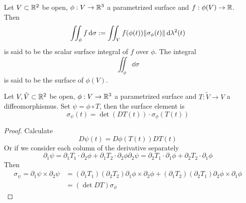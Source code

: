 \documentclass[../../script.tex]{subfiles}
\begin{document}
\begin{defi}
    Let $V \subset \mathbb{R}^2$ be open, $\phi: V \rightarrow \mathbb{R}^3$ a parametrized surface and $f: \phi(V) \rightarrow \mathbb{R}$. Then 
    \[
        \iint_{\phi} f \dd{\sigma} := \iint_V f(\phi(t)) \norm{\sigma_{\phi}(t)} \dd{\lambda^2(t)}
    \]
    is said to be the scalar surface integral of $f$ over $\phi$.
    The integral 
    \[
        \iint_{\phi} \dd{\sigma}
    \]
    is said to be the surface of $\phi(V)$.
\end{defi}

\begin{lem}
    Let $V, \tilde{V} \subset \mathbb{R}^2$ be open, $\phi: V \rightarrow \mathbb{R}^3$ a parametrized surface and $T: \tilde{V} \rightarrow V$ a diffeomorphismus.
    Set $\psi = \phi \circ T$, then the surface element is 
    \[
        \sigma_{\psi}(t) = \det(DT(t)) \cdot \sigma_{\phi}(T(t))
    \]
\end{lem}
\begin{proof}
    Calculate 
    \begin{equation}
        D\psi(t) = D\phi(T(t)) DT(t)
    \end{equation}
    Or if we consider each column of the derivative separately
    \begin{subequations}
        \begin{equation}
            \partial_1 \psi = \partial_1 T_1 \cdot \partial_2 \phi + \partial_1 T_2 \cdot \partial_2 \phi
        \end{equation}
        \begin{equation}
            \partial_2 \psi = \partial_2 T_1 \cdot \partial_1 \phi + \partial_2 T_2 \cdot \partial_1 \phi
        \end{equation}
    \end{subequations}
    Then 
    \begin{equation}
        \begin{split}
            \sigma_{\psi} = \partial_1 \psi \times \partial_2 \psi &= (\partial_1 T_1)(\partial_2 T_2) \partial_1 \phi \times \partial_2 \phi + (\partial_1T_2)(\partial_2 T_1)\partial_2 \phi \times \partial_1 \phi \\
            &= (\det DT) \sigma_{\phi}
        \end{split}
    \end{equation}
\end{proof}
\end{document}
